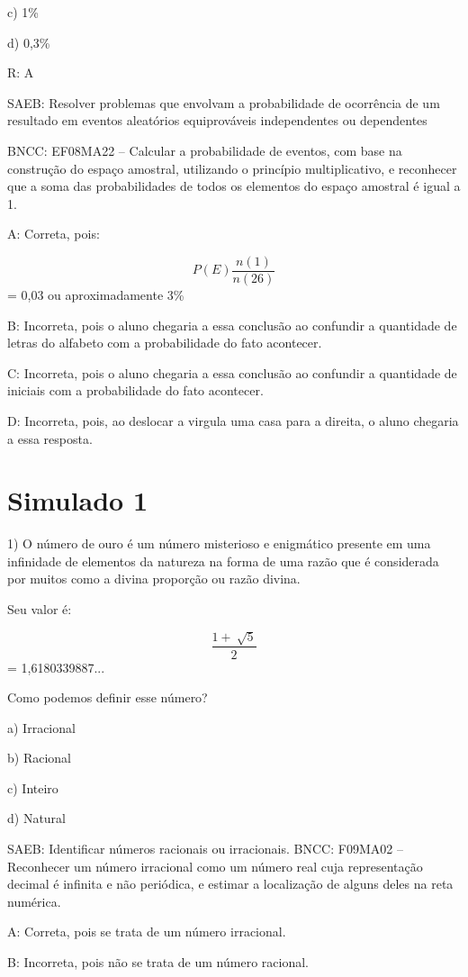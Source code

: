 c) 1\%

d) 0,3\%

R: A

SAEB: Resolver problemas que envolvam a probabilidade de ocorrência de
um resultado em eventos aleatórios equiprováveis independentes ou
dependentes

BNCC: EF08MA22 -- Calcular a probabilidade de eventos, com base na
construção do espaço amostral, utilizando o princípio multiplicativo, e
reconhecer que a soma das probabilidades de todos os elementos do espaço
amostral é igual a 1.

A: Correta, pois:

\[P(E)\frac{n(1)}{n(26)}\] = 0,03 ou aproximadamente 3\%

B: Incorreta, pois o aluno chegaria a essa conclusão ao confundir a
quantidade de letras do alfabeto com a probabilidade do fato acontecer.

C: Incorreta, pois o aluno chegaria a essa conclusão ao confundir a
quantidade de iniciais com a probabilidade do fato acontecer.

D: Incorreta, pois, ao deslocar a virgula uma casa para a direita, o
aluno chegaria a essa resposta.

\hypertarget{simulado-1}{%
\section{Simulado 1}\label{simulado-1}}

1) O número de ouro é um número misterioso e enigmático presente em uma
infinidade de elementos da natureza na forma de uma razão que é
considerada por muitos como a divina proporção ou razão divina.

Seu valor é:

\[\frac{1 + \ \sqrt{5}}{2}\] = 1,6180339887...

Como podemos definir esse número?

a) Irracional

b) Racional

c) Inteiro

d) Natural

SAEB: Identificar números racionais ou irracionais. BNCC: F09MA02 --
Reconhecer um número irracional como um número real cuja representação
decimal é infinita e não periódica, e estimar a localização de alguns
deles na reta numérica.

A: Correta, pois se trata de um número irracional.

B: Incorreta, pois não se trata de um número racional.

